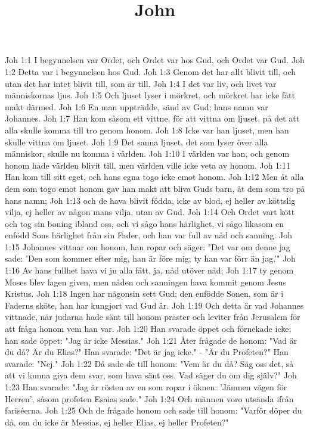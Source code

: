 

\title{John}

Joh 1:1  I begynnelsen var Ordet, och Ordet var hos Gud, och Ordet var Gud.
Joh 1:2  Detta var i begynnelsen hos Gud.
Joh 1:3  Genom det har allt blivit till, och utan det har intet blivit till, som är till.
Joh 1:4  I det var liv, och livet var människornas ljus.
Joh 1:5  Och ljuset lyser i mörkret, och mörkret har icke fått makt därmed.
Joh 1:6  En man uppträdde, sänd av Gud; hans namn var Johannes.
Joh 1:7  Han kom såsom ett vittne, för att vittna om ljuset, på det att alla skulle komma till tro genom honom.
Joh 1:8  Icke var han ljuset, men han skulle vittna om ljuset.
Joh 1:9  Det sanna ljuset, det som lyser över alla människor, skulle nu komma i världen.
Joh 1:10  I världen var han, och genom honom hade världen blivit till, men världen ville icke veta av honom.
Joh 1:11  Han kom till sitt eget, och hans egna togo icke emot honom.
Joh 1:12  Men åt alla dem som togo emot honom gav han makt att bliva Guds barn, åt dem som tro på hans namn;
Joh 1:13  och de hava blivit födda, icke av blod, ej heller av köttslig vilja, ej heller av någon mans vilja, utan av Gud.
Joh 1:14  Och Ordet vart kött och tog sin boning ibland oss, och vi sågo hans härlighet, vi sågo likasom en enfödd Sons härlighet från sin Fader, och han var full av nåd och sanning.
Joh 1:15  Johannes vittnar om honom, han ropar och säger: "Det var om denne jag sade: 'Den som kommer efter mig, han är före mig; ty han var förr än jag.'"
Joh 1:16  Av hans fullhet hava vi ju alla fått, ja, nåd utöver nåd;
Joh 1:17  ty genom Moses blev lagen given, men nåden och sanningen hava kommit genom Jesus Kristus.
Joh 1:18  Ingen har någonsin sett Gud; den enfödde Sonen, som är i Faderns sköte, han har kungjort vad Gud är.
Joh 1:19  Och detta är vad Johannes vittnade, när judarna hade sänt till honom präster och leviter från Jerusalem för att fråga honom vem han var.
Joh 1:20  Han svarade öppet och förnekade icke; han sade öppet: "Jag är icke Messias."
Joh 1:21  Åter frågade de honom: "Vad är du då? Är du Elias?" Han svarade: "Det är jag icke." - "Är du Profeten?" Han svarade: "Nej."
Joh 1:22  Då sade de till honom: "Vem är du då? Säg oss det, så att vi kunna giva dem svar, som hava sänt oss. Vad säger du om dig själv?"
Joh 1:23  Han svarade: "Jag är rösten av en som ropar i öknen: 'Jämnen vägen för Herren', såsom profeten Esaias sade."
Joh 1:24  Och männen voro utsända ifrån fariséerna.
Joh 1:25  Och de frågade honom och sade till honom: "Varför döper du då, om du icke är Messias, ej heller Elias, ej heller Profeten?"

